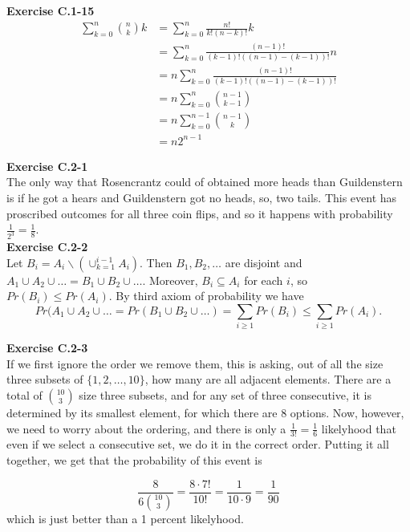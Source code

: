 \documentclass{article}
\begin{document}
\noindent\textbf{Exercise C.1-15}\\

\begin{align*}
\sum_{k=0}^n \binom{n}{k}k &= \sum_{k=0}^n \frac{n!}{k!(n-k)!}k\\
&=\sum_{k=0}^n \frac{(n-1)!}{(k-1)!((n-1)-(k-1))!} n\\
&= n \sum_{k=0}^{n}\frac{(n-1)!}{(k-1)!((n-1)-(k-1))!}\\
&=n \sum_{k=0}^n \binom{n-1}{k-1}\\
&=n \sum_{k=0}^{n-1} \binom{n-1}{k}\\
&=n2^{n-1}
\end{align*}

\noindent\textbf{Exercise C.2-1}\\

The only way that Rosencrantz could of obtained more heads than Guildenstern is if he got a hears and Guildenstern got no heads, so, two tails. This event has proscribed outcomes for all three coin flips, and so it happens with probability $\frac{1}{2^3} = \frac{1}{8}$.\\


\noindent\textbf{Exercise C.2-2}\\

Let $B_i = A_i \backslash (\cup_{k=1}^{i-1}A_i)$.  Then $B_1, B_2, \ldots $ are disjoint and $A_1 \cup A_2 \cup \ldots = B_1 \cup B_2 \cup \ldots$.  Moreover, $B_i \subseteq A_i$ for each $i$, so $Pr(B_i) \leq Pr(A_i)$.  By third axiom of probability we have 
\[ Pr(A_1 \cup A_2 \cup \ldots = Pr(B_1 \cup B_2 \cup \ldots) = \sum_{i \geq 1} Pr(B_i) \leq \sum_{i \geq 1} Pr(A_i).\]

\noindent\textbf{Exercise C.2-3}\\

If we first ignore the order we remove them, this is asking, out of all the size three subsets of $\{1,2,\ldots,10\}$, how many are all adjacent elements. There are a total of $\binom{10}{3}$ size three subsets, and for any set of three consecutive, it is determined by its smallest element, for which there are 8 options. Now, however, we need to worry about the ordering, and there is only a $\frac{1}{3!} = \frac{1}{6}$ likelyhood that even if we select a consecutive set, we do it in the correct order. Putting it all together, we get that the probability of this event is 

\[
\frac{8}{6\binom{10}{3}} = \frac{8\cdot7!}{10!} = \frac{1}{10\cdot 9} = \frac{1}{90}
\]
which is just better than a 1 percent likelyhood.\\
\end{document}
